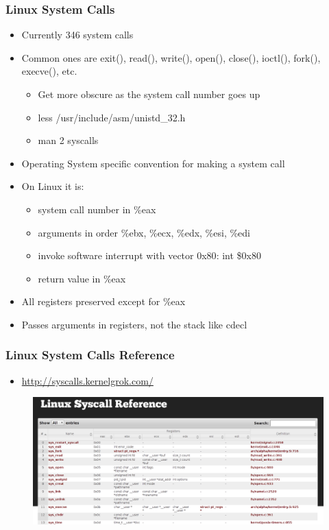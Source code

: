 \documentclass[11pt,xcolor=dvipsnames]{beamer}
\begin{document}
\begin{frame}[fragile,t]
\frametitle{Linux System Calls}
\begin{itemize}
  \item Currently 346 system calls
  \item Common ones are {\ttfamily exit(), read(), write(), open(), close(), ioctl(), fork(), execve()}, etc.
  \pause
  \begin{itemize}
  \item Get more obscure as the system call number goes up
  \item {\ttfamily less /usr/include/asm/unistd\_32.h}
  \item {\ttfamily man 2 syscalls}
  \end{itemize}
  \pause
  \item Operating System specific convention for making a system call
  \pause
  \item On Linux it is:
  \begin{itemize}
    \item system call number in {\ttfamily \%eax}
    \item arguments in order {\ttfamily \%ebx, \%ecx, \%edx, \%esi, \%edi}
    \item invoke software interrupt with vector {\ttfamily 0x80}: {\ttfamily int \$0x80}
    \item return value in \%eax
  \end{itemize}
  \pause
  \item All registers preserved except for {\ttfamily \%eax}
  \item Passes arguments in registers, not the stack like {\ttfamily cdecl}
\end{itemize}
\end{frame}

\begin{frame}[fragile,t]
\frametitle{Linux System Calls Reference}
\begin{itemize}
  \item \url{http://syscalls.kernelgrok.com/}
\end{itemize}
\begin{figure}
\centering
\includegraphics[height=0.50\paperheight]{figures/syscalls.png}
\end{figure}
\end{frame}
\end{document}
